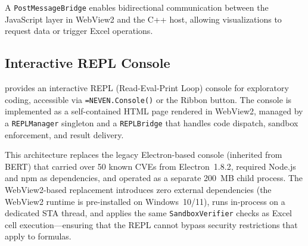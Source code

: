 A \texttt{PostMessageBridge} enables bidirectional communication between the JavaScript layer in WebView2 and the C++ host, allowing visualizations to request data or trigger Excel operations.

\subsection{Interactive REPL Console}
\label{subsec:repl}

\neven{} provides an interactive REPL (Read-Eval-Print Loop) console for exploratory coding, accessible via \texttt{=NEVEN.Console()} or the Ribbon button. The console is implemented as a self-contained HTML page rendered in WebView2, managed by a \texttt{REPLManager} singleton and a \texttt{REPLBridge} that handles code dispatch, sandbox enforcement, and result delivery.

This architecture replaces the legacy Electron-based console (inherited from BERT) that carried over 50 known CVEs from Electron~1.8.2, required Node.js and npm as dependencies, and operated as a separate 200~MB child process. The WebView2-based replacement introduces zero external dependencies (the WebView2 runtime is pre-installed on Windows~10/11), runs in-process on a dedicated STA thread, and applies the same \texttt{SandboxVerifier} checks as Excel cell execution---ensuring that the REPL cannot bypass security restrictions that apply to formulas.
